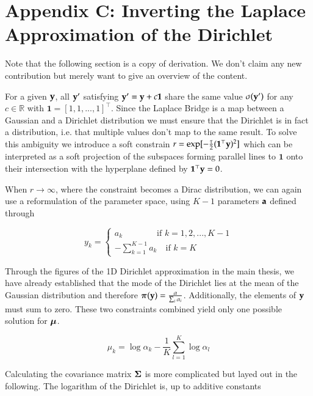 \section*{Appendix C: Inverting the Laplace Approximation of the Dirichlet}
\label{sec:InversionLADirichlet}

Note that the following section is a copy of \cite{Hennig2010} derivation. We don't claim any new contribution but merely want to give an overview of the content. 

For a given ${\mathbf{y}}$, all ${\mathbf{y}}'$ satisfying ${\mathbf{y}}' = {\mathbf{y}} + c \mathbf{1}$ share the same value $\sigma({\mathbf{y}}')$ for any $c \in \mathbb{R}$ with $\mathbf{1} = [1,1, ..., 1]^\top$. Since the Laplace Bridge is a map between a Gaussian and a Dirichlet distribution we must ensure that the Dirichlet is in fact a distribution, i.e. that multiple values don't map to the same result. To solve this ambiguity we introduce a soft constrain $r = \exp[-\frac{\tau}{2}(\mathbf{1}^\top {\mathbf{y}})^2]$ which can be interpreted as a soft projection of the subspaces forming parallel lines to $\mathbf{1}$ onto their intersection with the hyperplane defined by $\mathbf{1}^\top {\mathbf{y}} = 0$. 

When $r \rightarrow \infty$, where the constraint becomes a Dirac distribution, we can again use a reformulation of the parameter space, using $K-1$ parameters ${\mathbf{a}}$ defined through

\begin{equation}
	y_k = \begin{cases}
		a_k \qquad \qquad \text{if } k = 1,2, ..., K-1 \\
		- \sum_{k=1}^{K-1} a_k \quad \text{if } k = K
	\end{cases}
\end{equation}

Through the figures of the 1D Dirichlet approximation in the main thesis, we have already established that the mode of the Dirichlet lies at the mean of the Gaussian distribution and therefore $\boldsymbol{\pi}(\mathbf{y}) = \frac{\mathbf{\alpha}}{\sum_i \alpha_i}$. Additionally, the elements of $\mathbf{y}$ must sum to zero. These two constraints combined yield only one possible solution for ${\boldsymbol{\mu}}$.

\begin{equation}
	\mu_k = \log \alpha_k  - \frac{1}{K} \sum_{l=1}^{K} \log \alpha_l
	\label{eq:mu_k}
\end{equation}

Calculating the covariance matrix ${\boldsymbol{\Sigma}}$ is more complicated but layed out in the following. The logarithm of the Dirichlet is, up to additive constants


